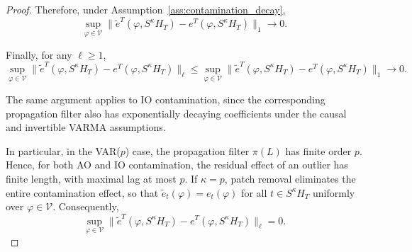\documentclass[12pt]{article}
\numberwithin{equation}{section}
\begin{document}
\begin{proof}
Therefore, under Assumption~\ref{ass:contamination_decay},
\begin{equation}
\sup_{\varphi \in \mathcal V}
\|\tilde{e}^T(\varphi,S^\kappa H_T)-e^T(\varphi,S^\kappa H_T)\|_1 \to 0.
\end{equation}

Finally, for any $\ell\ge 1$,
\begin{equation}
\sup_{\varphi \in \mathcal V}
\|\tilde{e}^T(\varphi,S^\kappa H_T)-e^T(\varphi,S^\kappa H_T)\|_\ell
\le
\sup_{\varphi \in \mathcal V}
\|\tilde{e}^T(\varphi,S^\kappa H_T)-e^T(\varphi,S^\kappa H_T)\|_1
\to 0.
\end{equation}

The same argument applies to IO contamination, since the corresponding propagation filter also has exponentially decaying coefficients under the causal and invertible VARMA assumptions.

In particular, in the VAR($p$) case, the propagation filter $\pi(L)$ has finite order $p$.
Hence,
for both AO and IO contamination, the residual effect of an outlier has finite length, with maximal lag at most $p$.
If $\kappa = p$, patch removal eliminates the entire contamination effect, so that
$\tilde{e}_t(\varphi)=e_t(\varphi)$
for all $t \in S^\kappa H_T$
uniformly over $\varphi \in \mathcal V$.
Consequently,
\begin{equation}
\sup_{\varphi \in \mathcal V}
\|\tilde{e}^T(\varphi,S^\kappa H_T)-e^T(\varphi,S^\kappa H_T)\|_\ell
= 0.
\end{equation}
\end{proof}
\end{document}
